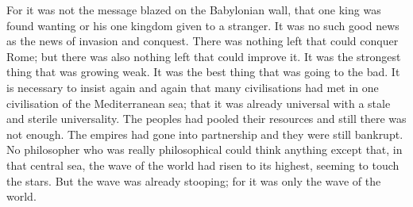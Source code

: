 For it was not the message blazed on the Babylonian wall, that one king was found wanting or his one kingdom given to a stranger. It was no such good news as the news of invasion and conquest. There was nothing left that could conquer Rome; but there was also nothing left that could improve it. It was the strongest thing that was growing weak. It was the best thing that was going to the bad. It is necessary to insist again and again that many civilisations had met in one civilisation of the Mediterranean sea; that it was already universal with a stale and sterile universality. The peoples had pooled their resources and still there was not enough. The empires had gone into partnership and they were still bankrupt. No philosopher who was really philosophical could think anything except that, in that central sea, the wave of the world had risen to its highest, seeming to touch the stars. But the wave was already stooping; for it was only the wave of the world.

